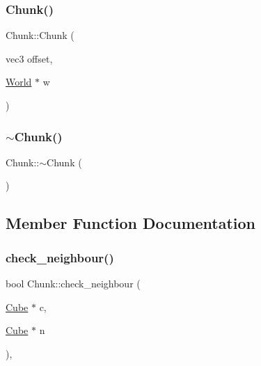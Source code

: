 \mbox{\label{classChunk_a2f6fc0e3c9306d4dd7209b236305c7ad}} 
\subsubsection{\texorpdfstring{Chunk()}{Chunk()}\hspace{0.1cm}{\footnotesize\ttfamily [3/3]}}
{\footnotesize\ttfamily Chunk\+::\+Chunk (\begin{DoxyParamCaption}\item[{vec3}]{offset,  }\item[{\mbox{\hyperlink{classWorld}{World}} $\ast$}]{w }\end{DoxyParamCaption})}

\mbox{\label{classChunk_ad21b515f41c9a1d21740b9e7e3f8eede}} 
\subsubsection{\texorpdfstring{$\sim$\+Chunk()}{~Chunk()}}
{\footnotesize\ttfamily Chunk\+::$\sim$\+Chunk (\begin{DoxyParamCaption}{ }\end{DoxyParamCaption})}



\subsection{Member Function Documentation}
\mbox{\label{classChunk_a6156a96628c9077e34edb0da50f4e4d2}} 
\subsubsection{\texorpdfstring{check\+\_\+neighbour()}{check\_neighbour()}}
{\footnotesize\ttfamily bool Chunk\+::check\+\_\+neighbour (\begin{DoxyParamCaption}\item[{\mbox{\hyperlink{classCube}{Cube}} $\ast$}]{c,  }\item[{\mbox{\hyperlink{classCube}{Cube}} $\ast$}]{n }\end{DoxyParamCaption})\hspace{0.3cm}{\ttfamily [inline]}, {\ttfamily [private]}}

